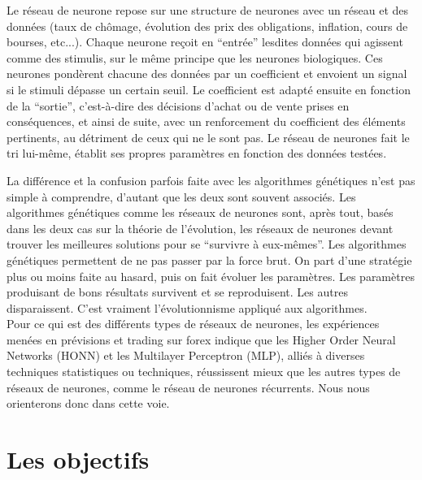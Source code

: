 \documentclass[a4paper,12pt]{article}
\begin{document}
Le réseau de neurone repose sur une structure de neurones avec un réseau et des données (taux de chômage, évolution des prix des obligations, inflation, cours de bourses, etc...). Chaque neurone reçoit en “entrée” lesdites données qui agissent comme des stimulis, sur le même principe que les neurones biologiques. Ces neurones pondèrent chacune des données par un coefficient et envoient un signal si le stimuli dépasse un certain seuil. Le coefficient est adapté ensuite en fonction de la “sortie”, c’est-à-dire des décisions d’achat ou de vente prises en conséquences, et ainsi de suite, avec un renforcement du coefficient des éléments pertinents, au détriment de ceux qui ne le sont pas. Le réseau de neurones fait le tri lui-même, établit ses propres paramètres en fonction des données testées.

La différence et la confusion parfois faite avec les algorithmes génétiques n’est pas simple à comprendre, d’autant que les deux sont souvent associés. Les algorithmes génétiques comme les réseaux de neurones sont, après tout, basés dans les deux cas sur la théorie de l’évolution, les réseaux de neurones devant trouver les meilleures solutions pour se “survivre à eux-mêmes”. Les algorithmes génétiques permettent de ne pas passer par la force brut. On part d’une stratégie plus ou moins faite au hasard, puis on fait évoluer les paramètres. Les paramètres produisant de bons résultats survivent et se reproduisent. Les autres disparaissent. C’est vraiment l’évolutionnisme appliqué aux algorithmes. \\

Pour ce qui est des différents types de réseaux de neurones, les expériences menées en prévisions et trading sur forex indique que les Higher Order Neural Networks (HONN) et les Multilayer Perceptron (MLP), alliés à diverses techniques statistiques ou techniques, réussissent mieux que les autres types de réseaux de neurones, comme le réseau de neurones récurrents. Nous nous orienterons donc dans cette voie.

\section{Les objectifs}
\end{document}
